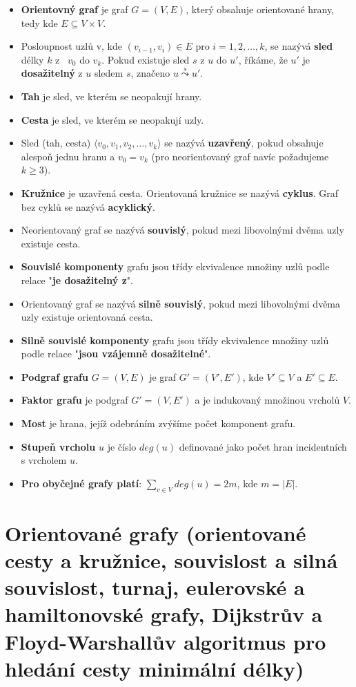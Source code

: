\documentclass[11pt,a4paper]{article}
\begin{document}
\begin{itemize}
\item \textbf{Orientovný graf} je graf $G = (V, E)$, který obsahuje orientované hrany, tedy kde $E \subseteq V \times V$.

\item Posloupnost uzlů v, kde $(v_{i-1}, v_i) \in E$ pro $i = 1,2,\dots,k$, se nazývá \textbf{sled} délky $k$ z \ $v_0$ do $v_k$. Pokud existuje sled $s$ z $u$ do $u'$, říkáme, že $u'$ je \textbf{dosažitelný} z $u$ sledem $s$, značeno $u \overset{s}{\leadsto} u'$.

\item \textbf{Tah} je sled, ve kterém se neopakují hrany.

\item \textbf{Cesta} je sled, ve kterém se neopakují uzly.

\item Sled (tah, cesta) $\langle v_0, v_1, v_2, \dots, v_k\rangle$ se nazývá \textbf{uzavřený}, pokud obsahuje alespoň jednu hranu a $v_0 = v_k$ (pro neorientovaný graf navíc požadujeme $k \geq 3$).

\item \textbf{Kružnice} je uzavřená cesta. Orientovaná kružnice se nazývá \textbf{cyklus}. Graf bez cyklů se nazývá \textbf{acyklický}.

\item Neorientovaný graf se nazývá \textbf{souvislý}, pokud mezi libovolnými dvěma uzly existuje cesta.

\item \textbf{Souvislé komponenty} grafu jsou třídy ekvivalence množiny uzlů podle relace "\textbf{je dosažitelný z}".

\item Orientovaný graf se nazývá \textbf{silně souvislý}, pokud mezi libovolnými dvěma uzly existuje orientovaná cesta.

\item \textbf{Silně souvislé komponenty} grafu jsou třídy ekvivalence množiny uzlů podle relace "\textbf{jsou vzájemně dosažitelné}".

\item \textbf{Podgraf grafu} $G = (V, E)$ je graf $G' = (V', E')$, kde $V' \subseteq V$ a $E' \subseteq E$.

\item \textbf{Faktor grafu} je podgraf $G' = (V, E')$ a je indukovaný množinou vrcholů $V$.

\item \textbf{Most} je hrana, jejíž odebráním zvýšíme počet komponent grafu.

\item \textbf{Stupeň vrcholu} $u$ je číslo $deg(u)$ definované jako počet hran incidentních s vrcholem $u$.

\item \textbf{Pro obyčejné grafy platí}: $\sum_{v \in V} deg(u) = 2m$, kde $m = |E|$.
\end{itemize}
\section{Orientované grafy (orientované cesty a kružnice, souvislost a silná souvislost, turnaj, eulerovské a hamiltonovské grafy, Dijkstrův a Floyd-Warshallův algoritmus pro hledání cesty minimální délky)}
\end{document}
